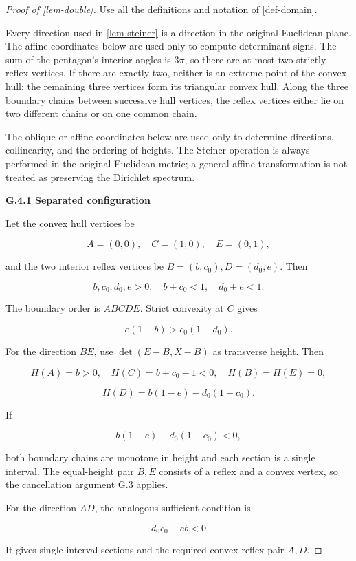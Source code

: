 \documentclass[11pt,a4paper]{article}
\theoremstyle{proofmanuscript}
\begin{document}
\begin{proof}[Proof of \ref{lem-double}]

Use all the definitions and notation of \ref{def-domain}.

Every direction used in \ref{lem-steiner} is a direction in the original Euclidean plane. The affine coordinates below are used only to compute determinant signs. The sum of the pentagon's interior angles is \(3\pi\), so there are at most two strictly reflex vertices. If there are exactly two, neither is an extreme point of the convex hull; the remaining three vertices form its triangular convex hull. Along the three boundary chains between successive hull vertices, the reflex vertices either lie on two different chains or on one common chain.

The oblique or affine coordinates below are used only to determine directions, collinearity, and the ordering of heights. The Steiner operation is always performed in the original Euclidean metric; a general affine transformation is not treated as preserving the Dirichlet spectrum.

\textbf{G.4.1 Separated configuration}

Let the convex hull vertices be

\[
A=(0,0),\quad C=(1,0),\quad E=(0,1),
\]

and the two interior reflex vertices be \(B=(b,c_0),D=(d_0,e)\). Then

\[
b,c_0,d_0,e>0,\quad b+c_0<1,\quad d_0+e<1.
\]

The boundary order is \(A B C D E\). Strict convexity at \(C\) gives

\[
e(1-b)>c_0(1-d_0).
\tag{G.4.1}
\]

For the direction \(BE\), use \(\det(E-B,X-B)\) as transverse height. Then

\[
H(A)=b>0,\quad H(C)=b+c_0-1<0,\quad H(B)=H(E)=0,
\]

\[
H(D)=b(1-e)-d_0(1-c_0).
\]

If

\[
b(1-e)-d_0(1-c_0)<0,
\tag{G.4.2}
\]

both boundary chains are monotone in height and each section is a single interval. The equal-height pair \(B,E\) consists of a reflex and a convex vertex, so the cancellation argument G.3 applies.

For the direction \(AD\), the analogous sufficient condition is

\[
d_0c_0-eb<0
\tag{G.4.3}
\]

It gives single-interval sections and the required convex-reflex pair \(A,D\).


\end{proof}
\end{document}
